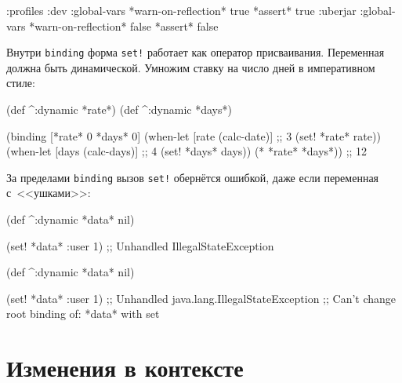 \else

\begin{english}
  \begin{clojure}
{:profiles
 :dev {:global-vars {*warn-on-reflection* true
                     *assert* true}}
 :uberjar {:global-vars {*warn-on-reflection* false
                         *assert* false}}}
  \end{clojure}
\end{english}

\fi

Внутри \verb|binding| форма \verb|set!| работает как оператор
присваивания. Переменная должна быть динамической. Умножим ставку на число дней
в императивном стиле:

\begin{english}
  \begin{clojure}
(def ^:dynamic *rate*)
(def ^:dynamic *days*)

(binding [*rate* 0
          *days* 0]
  (when-let [rate (calc-date)] ;; 3
    (set! *rate* rate))
  (when-let [days (calc-days)] ;; 4
    (set! *days* days))
  (* *rate* *days*))
;; 12
  \end{clojure}
\end{english}

За пределами \verb|binding| вызов \verb|set!| обернётся ошибкой, даже если
переменная с~<<ушками>>:

\ifnarrow

\begin{english}
  \begin{clojure}
(def ^:dynamic *data* nil)

(set! *data* {:user 1})
;; Unhandled IllegalStateException
  \end{clojure}
\end{english}

\else

\begin{english}
  \begin{clojure}
(def ^:dynamic *data* nil)

(set! *data* {:user 1})
;; Unhandled java.lang.IllegalStateException
;; Can't change root binding of: *data* with set
  \end{clojure}
\end{english}

\fi

\section{Изменения в контексте}

